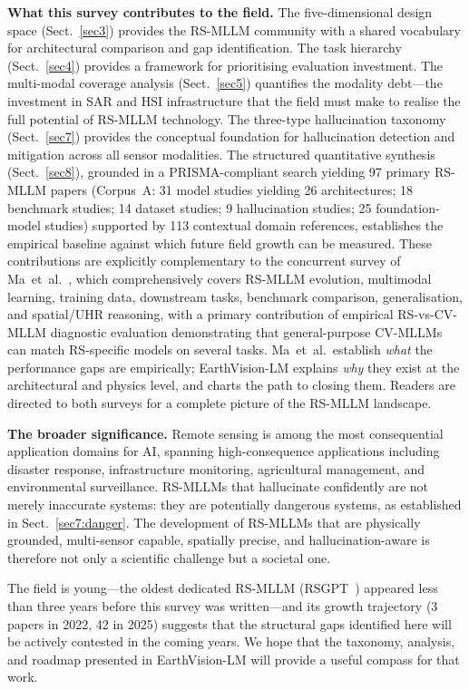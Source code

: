\textbf{What this survey contributes to the field.}
The five-dimensional design space (Sect.~\ref{sec3}) provides the RS-MLLM community
with a shared vocabulary for architectural comparison and gap identification. The
task hierarchy (Sect.~\ref{sec4}) provides a framework for prioritising evaluation
investment. The multi-modal coverage analysis (Sect.~\ref{sec5}) quantifies the
modality debt---the investment in SAR and HSI infrastructure that the field must
make to realise the full potential of RS-MLLM technology. The three-type
hallucination taxonomy (Sect.~\ref{sec7}) provides the conceptual foundation for
hallucination detection and mitigation across all sensor modalities. The structured quantitative synthesis
(Sect.~\ref{sec8}), grounded in a PRISMA-compliant search yielding 97 primary
RS-MLLM papers (Corpus~A: 31 model studies yielding 26 architectures; 18 benchmark
studies; 14 dataset studies; 9 hallucination studies; 25 foundation-model studies)
supported by 113 contextual domain references, establishes
the empirical baseline against which future field growth can be measured.
These contributions are explicitly complementary to the concurrent survey of
Ma~et~al.~\cite{ma2026dsorsp}, which comprehensively covers RS-MLLM evolution,
multimodal learning, training data, downstream tasks, benchmark comparison,
generalisation, and spatial/UHR reasoning, with a primary contribution of
empirical RS-vs-CV-MLLM diagnostic evaluation demonstrating that general-purpose
CV-MLLMs can match RS-specific models on several tasks. Ma~et~al.\ establish
\emph{what} the performance gaps are empirically; EarthVision-LM explains
\emph{why} they exist at the architectural and physics level, and charts the
path to closing them. Readers are directed to both surveys for a complete
picture of the RS-MLLM landscape.

\textbf{The broader significance.}
Remote sensing is among the most consequential application domains for AI,
spanning high-consequence applications including disaster response, infrastructure
monitoring, agricultural management, and environmental surveillance.
RS-MLLMs that hallucinate confidently are not merely inaccurate systems:
they are potentially dangerous systems, as established in Sect.~\ref{sec7:danger}.
The development of RS-MLLMs that are physically grounded, multi-sensor capable,
spatially precise, and hallucination-aware is therefore not only a scientific
challenge but a societal one.

The field is young---the oldest dedicated RS-MLLM (RSGPT~\cite{rsgpt2023}) appeared
less than three years before this survey was written---and its growth trajectory
(3 papers in 2022, 42 in 2025) suggests that the structural gaps identified here
will be actively contested in the coming years. We hope that the taxonomy, analysis,
and roadmap presented in EarthVision-LM will provide a useful compass for that work.
